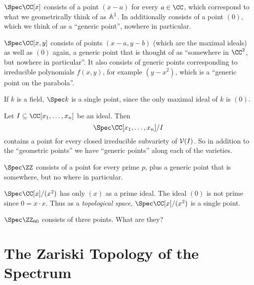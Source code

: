 \begin{example}
	\listhack
	\begin{enumerate}[(a)]
		\ii $\Spec \CC[x]$ consists of a point $(x-a)$ for every $a \in \CC$,
		which correspond to what we geometrically think of as $\mathbb A^1$.
		In additionally consists of a point $(0)$,
		which we think of as a ``generic point'', nowhere in particular.

		\ii $\Spec \CC[x,y]$ consists of points $(x-a,y-b)$
		(which are the maximal ideals) as well as $(0)$ again, a generic
		point that is thought of as ``somewhere in $\CC^2$,
		but nowhere in particular''.
		It also consists of generic points corresponding to irreducible
		polynomials $f(x,y)$, for example $(y-x^2)$,
		which is a ``generic point on the parabola''.

		\ii If $k$ is a field, $\Spec k$ is a single point,
		since the only maximal ideal of $k$ is $(0)$.
	\end{enumerate}
\end{example}
\begin{example}
	Let $I \subseteq \CC[x_1, \dots, x_n]$ be an ideal.
	Then \[ \Spec \CC[x_1, \dots, x_n] /I \] contains a
	point for every closed irreducible subvariety of $\mathcal V(I)$.
	So in addition to the ``geometric points'' we have
	``generic points'' along each of the varieties.
\end{example}
\begin{example}
	\listhack
	\begin{enumerate}[(a)]
		\ii $\Spec \ZZ$ consists of a point for every prime $p$,
		plus a generic point that is somewhere, but no where in particular.

		\ii $\Spec \CC[x] / (x^2)$ has only $(x)$ as a prime ideal.
		The ideal $(0)$ is not prime since $0 = x \cdot x$.
		Thus as a \emph{topological space},
		$\Spec \CC[x] / (x^2)$ is a single point.
		
		\ii $\Spec \Zc{60}$ consists of three points.
		What are they?
	\end{enumerate}
\end{example}

\section{The Zariski Topology of the Spectrum}

